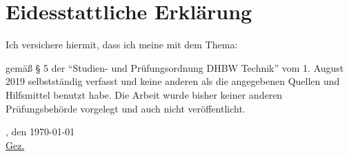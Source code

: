 \chapter*{Eidesstattliche Erklärung}
Ich versichere hiermit, dass ich meine \arbeit{} mit dem Thema:
\begin{quote}
	\textit{\titel}
\end{quote}
gemäß § 5 der \enquote{Studien- und Prüfungsordnung DHBW Technik} vom 1. August 2019 selbstständig verfasst und keine anderen als die angegebenen Quellen und Hilfsmittel benutzt habe. Die Arbeit wurde bisher keiner anderen Prüfungsbehörde vorgelegt und auch nicht veröffentlicht.

\vspace{1cm}

\verfassungsort, den \today \\[0.5cm]
	{\underline{Gez. \autor}}
	{\makebox[6cm]{\hrulefill}}\\
\autorReverse
